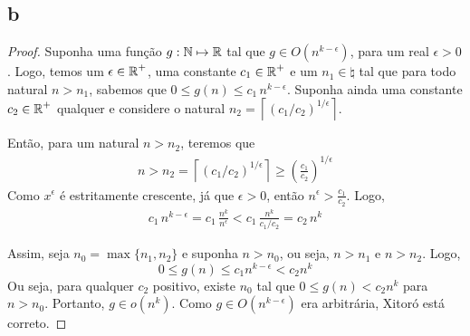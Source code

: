 \subsection{b}

\begin{proof}
    Suponha uma função $g: \operatorname{\mathbb{N}} \mapsto \operatorname{\mathbb{R}}$ tal que $g \in O\left(n^{k-\epsilon}\right)$, para um real $\epsilon > 0$. Logo, temos um $\epsilon \in \operatorname{\mathbb{R}}^+$, uma constante $c_1 \in \operatorname{\mathbb{R}}^+$ e um $n_1 \in \natural$ tal que para todo natural $n > n_1$, sabemos que $0 \leq g(n) \leq c_1\, n^{k - \epsilon}$. Suponha ainda uma constante $c_2 \in \operatorname{\mathbb{R}}^+$ qualquer e considere o natural $n_2 = \left\lceil(c_1 / c_2)^{1/\epsilon}\right\rceil$.

    Então, para um natural $n > n_2$, teremos que
    \begin{align*}
        n > n_2 = \left\lceil(c_1 / c_2)^{1/\epsilon}\right\rceil \geq \left(\frac{c_1}{c_2}\right)^{1/\epsilon}
    \end{align*}
    Como $x^\epsilon$ é estritamente crescente, já que $\epsilon > 0$, então $n^\epsilon > \frac{c_1}{c_2}$. Logo,
    \begin{align*}
        c_1\, n^{k-\epsilon} = c_1\, \frac{n^k}{n^\epsilon} < c_1\, \frac{n^k}{c_1 / c_2} = c_2\, n^k
    \end{align*}

    Assim, seja $n_0 = \max\{n_1, n_2\}$ e suponha $n > n_0$, ou seja, $n > n_1$ e $n > n_2$. Logo,
    \[
        0 \leq g(n) \leq c_1 n^{k-\epsilon} < c_2 n^k
    \]
    Ou seja, para qualquer $c_2$ positivo, existe $n_0$ tal que $0 \leq g(n) < c_2 n^k$ para $n > n_0$. Portanto, $g \in o\left(n^k\right)$. Como $g \in O\left(n^{k-\epsilon}\right)$ era arbitrária, Xitoró está correto.
\end{proof}
